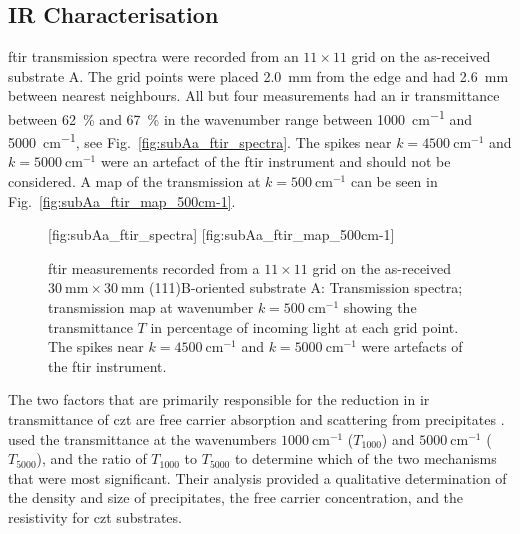 \subsection{IR Characterisation}

\Ac{ftir} transmission spectra were recorded from an $11\times11$ grid on the as-received substrate A. The grid points were placed \SI{2.0}{\milli\metre} from the edge and had \SI{2.6}{\milli\metre} between nearest neighbours. All but four measurements had an \ac{ir} transmittance between \SI{62}{\percent} and \SI{67}{\percent} in the wavenumber range between \SI{1000}{\centi\metre^{-1}} and \SI{5000}{\centi\metre^{-1}}, see Fig.~\ref{fig:subAa_ftir_spectra}. The spikes near $k=\SI{4500}{\centi\metre^{-1}}$ and $k=\SI{5000}{\centi\metre^{-1}}$ were an artefact of the \ac{ftir} instrument and should not be considered. A map of the transmission at $k=\SI{500}{\centi\metre^{-1}}$ can be seen in Fig.~\ref{fig:subAa_ftir_map_500cm-1}.

\begin{figure}[htbp]
    \centering
    [fig:subAa_ftir_spectra]
    \hfill
    [fig:subAa_ftir_map_500cm-1]
    \caption[\Ac{ftir} measurements of the as-received substrate A.]{\Ac{ftir} measurements recorded from a $11\times11$ grid on the as-received $\SI{30}{\milli\metre}\times\SI{30}{\milli\metre}$ (111)B-oriented substrate A:  Transmission spectra;  transmission map at wavenumber $k=\SI{500}{\centi\metre^{-1}}$ showing the transmittance $T$ in percentage of incoming light at each grid point. The spikes near $k=\SI{4500}{\centi\metre^{-1}}$ and $k=\SI{5000}{\centi\metre^{-1}}$ were artefacts of the \ac{ftir} instrument.}
\end{figure}

The two factors that are primarily responsible for the reduction in \ac{ir} transmittance of \ac{czt} are free carrier absorption and scattering from precipitates \citep{yadava1994precipitation}. \citet{yujie2004infrared} used the transmittance at the wavenumbers $\SI{1000}{\centi\metre^{-1}}$ ($T_{1000}$) and $\SI{5000}{\centi\metre^{-1}}$ ($T_{5000}$), and the ratio of $T_{1000}$ to $T_{5000}$ to determine which of the two mechanisms that were most significant. Their analysis provided a qualitative determination of the density and size of  precipitates, the free carrier concentration, and the resistivity for \ac{czt} substrates. %

